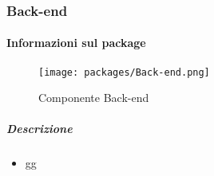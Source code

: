 
  \subsubsection{Back-end}
  \paragraph{Informazioni sul package} 
    \begin{figure}[H] 
      \begin{center} 
        \texttt{[image: packages/Back-end.png]}  
        \caption{Componente Back-end}
      \end{center}  
    \end{figure} 
  \subparagraph{Descrizione} 
    \begin{itemize}
    \item[] gg
    \end{itemize} 